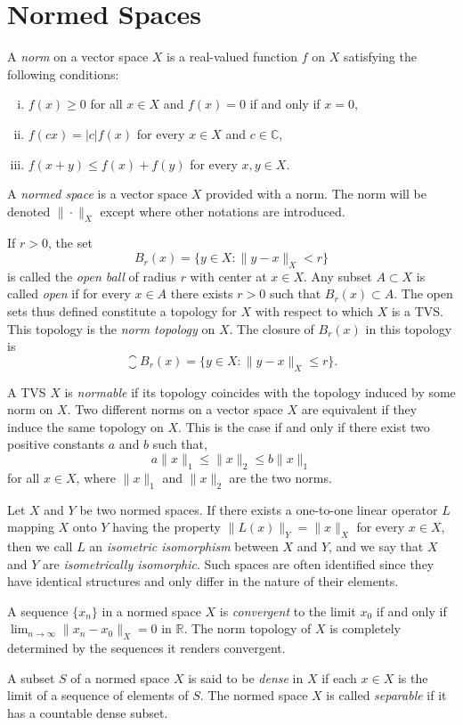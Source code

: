 \section{Normed Spaces}

\begin{para}[Norms]
  A \emph{norm} on a vector space $X$ is a real-valued function $f$ on $X$
  satisfying the following conditions:
  \begin{enumerate}[(i)]
    \item $f(x)\geq 0$ for all $x\in X$ and $f(x)=0$ if and only if $x=0$,
    \item $f(cx)=|c|f(x)$ for every $x\in X$ and $c\in \mathbb{C}$,
    \item $f(x+y)\leq f(x)+f(y)$ for every $x,y\in X$.
  \end{enumerate}
  A \emph{normed space} is a vector space $X$ provided with a norm.
  The norm will be denoted $\|\cdot\|_X$ except where other notations are introduced.
  
  If $r>0$, the set
  \[B_r(x) = \{y\in X\colon \|y-x\|_X<r\}\]
  is called the \emph{open ball} of radius $r$ with center at $x\in X$.
  Any subset $A\subset X$ is called \emph{open} if for every $x\in A$
  there exists $r > 0$ such that $B_r(x)\subset A$.
  The open sets thus defined constitute a topology for $X$ with respect to which $X$
  is a TVS. This topology is the \emph{norm topology} on $X$.
  The closure of $B_r(x)$ in this topology is
  \[\closure{B_r(x)} = \{y\in X\colon \|y-x\|_X\leq r\}.\]

  A TVS $X$ is \emph{normable} if its topology coincides with
  the topology induced by some norm on $X$. 
  Two different norms on a vector space $X$ are equivalent
  if they induce the same topology on $X$.
  This is the case if and only if there exist two positive constants $a$ and $b$ such that,
  \[a\|x\|_1\leq \|x\|_2\leq b\|x\|_1\]
  for all $x\in X$, where $\|x\|_1$ and $\|x\|_2$ are the two norms.

  Let $X$ and $Y$ be two normed spaces. If there exists a one-to-one linear operator $L$
  mapping $X$ onto $Y$ having the property $\|L(x)\|_Y = \|x\|_X$ for every $x\in X$,
  then we call $L$ an \emph{isometric isomorphism} between $X$ and $Y$,
  and we say that $X$ and $Y$ are \emph{isometrically isomorphic}.
  Such spaces are often identified since they have identical structures
  and only differ in the nature of their elements.
\end{para}


\begin{para}
  A sequence $\{x_n\}$ in a normed space $X$ is \emph{convergent} 
  to the limit $x_0$ if and only if $\lim_{n\to\infty} \|x_n - x_0\|_X = 0$ in $\mathbb{R}$.
  The norm topology of $X$ is completely determined by the sequences it renders convergent.

  A subset $S$ of a normed space $X$ is said to be \emph{dense} in $X$
  if each $x\in X$ is the limit of a sequence of elements of $S$.
  The normed space $X$ is called \emph{separable} if it has a countable dense subset.
\end{para}


